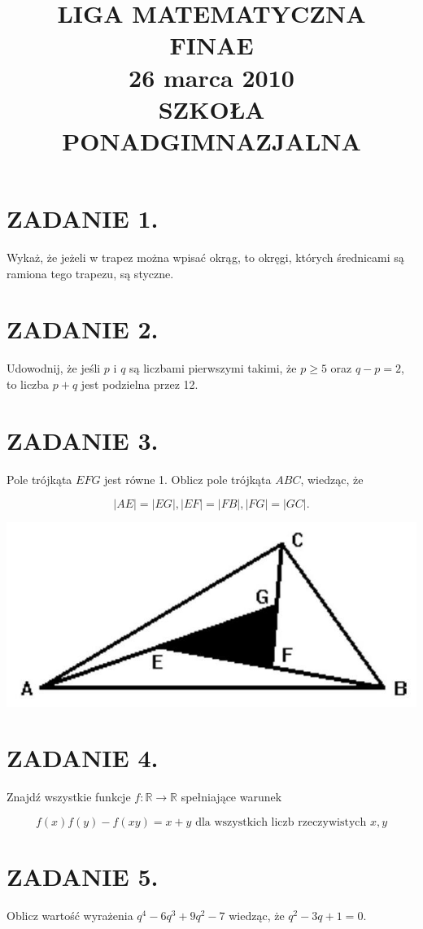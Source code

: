 \documentclass[10pt]{article}
\title{LIGA MATEMATYCZNA \\
 FINAE \\
 26 marca 2010 \\
 SZKOŁA PONADGIMNAZJALNA }
\author{}
\date{}
\begin{document}
\maketitle
\section*{ZADANIE 1.}
Wykaż, że jeżeli w trapez można wpisać okrąg, to okręgi, których średnicami są ramiona tego trapezu, są styczne.

\section*{ZADANIE 2.}
Udowodnij, że jeśli \(p\) i \(q\) są liczbami pierwszymi takimi, że \(p \geqslant 5\) oraz \(q-p=2\), to liczba \(p+q\) jest podzielna przez 12.

\section*{ZADANIE 3.}
Pole trójkąta \(E F G\) jest równe 1. Oblicz pole trójkąta \(A B C\), wiedząc, że

\[
|A E|=|E G|,|E F|=|F B|,|F G|=|G C| .
\]

\begin{center}
\includegraphics[max width=\textwidth]{2024_11_21_4d8e2eb8935e7b6d3c11g-1}
\end{center}

\section*{ZADANIE 4.}
Znajdź wszystkie funkcje \(f: \mathbb{R} \rightarrow \mathbb{R}\) spełniające warunek

\[
f(x) f(y)-f(x y)=x+y \text { dla wszystkich liczb rzeczywistych } x, y
\]

\section*{ZADANIE 5.}
Oblicz wartość wyrażenia \(q^{4}-6 q^{3}+9 q^{2}-7\) wiedząc, że \(q^{2}-3 q+1=0\).
\end{document}
